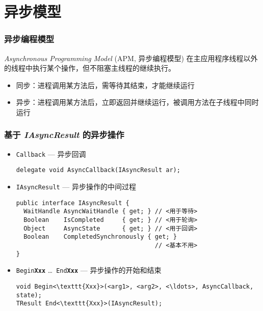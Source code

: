 \section{异步模型}

\begin{frame}
\frametitle{异步编程模型}
\begin{block}{\textit{Asynchronous Programming Model} (APM, 异步编程模型)}
\CJKindent  在主应用程序线程以外的线程中执行某个操作，但不阻塞主线程的继续执行。
\end{block}

\begin{itemize}
\item 同步：进程调用某方法后，需等待其结束，才能继续运行
\item 异步：进程调用某方法后，立即返回并继续运行，被调用方法在子线程中同时运行
\end{itemize}


\end{frame}


\begin{frame}[fragile]
\frametitle{基于 \textit{IAsyncResult} 的异步操作}

\begin{itemize}
\item \texttt{Callback} --- 异步回调
\begin{lstlisting}
delegate void AsyncCallback(IAsyncResult ar);
\end{lstlisting}
\item \texttt{IAsyncResult} --- 异步操作的中间过程
\begin{lstlisting}[escapeinside=<>]
public interface IAsyncResult {
  WaitHandle AsyncWaitHandle { get; } // <用于等待>
  Boolean    IsCompleted     { get; } // <用于轮询>
  Object     AsyncState      { get; } // <用于回调>
  Boolean    CompletedSynchronously { get; }
                                      // <基本不用>
}
\end{lstlisting}
\item \texttt{Begin\textbf{Xxx}} \ldots\ \texttt{End\textbf{Xxx}} --- 异步操作的开始和结束
\begin{lstlisting}[escapeinside=<>]
void Begin<\texttt{Xxx}>(<arg1>, <arg2>, <\ldots>, AsyncCallback, state);
TResult End<\texttt{Xxx}>(IAsyncResult);
\end{lstlisting}
\end{itemize}
\end{frame}



